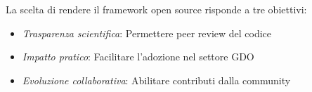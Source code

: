 La scelta di rendere il framework open source risponde a tre obiettivi:
\begin{itemize}
    \item \textit{Trasparenza scientifica}: Permettere peer review del codice
    \item \textit{Impatto pratico}: Facilitare l'adozione nel settore GDO
    \item \textit{Evoluzione collaborativa}: Abilitare contributi dalla community
\end{itemize}